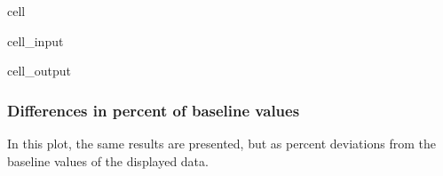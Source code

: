 \documentclass[letterpaper,10pt,english]{jupyterBook}
\begin{document}
\begin{sphinxuseclass}{cell}\begin{sphinxVerbatimInput}

\begin{sphinxuseclass}{cell_input}
\begin{sphinxVerbatim}[commandchars=\\\{\}]
 
\end{sphinxVerbatim}

\end{sphinxuseclass}\end{sphinxVerbatimInput}
\begin{sphinxVerbatimOutput}

\begin{sphinxuseclass}{cell_output}
\noindent{}

\noindent{}

\end{sphinxuseclass}\end{sphinxVerbatimOutput}

\end{sphinxuseclass}

\subsubsection{Differences in percent of baseline values}
\label{\detokenize{content/05_WBModels/ScenarioAnalysis:differences-in-percent-of-baseline-values}}
\sphinxAtStartPar
In this plot, the same results are presented, but as percent deviations from the baseline values of the displayed data.
\end{document}
